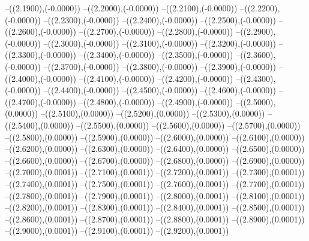 {	--({\sx*(2.1900)},{\sy*(-0.0000)})
	--({\sx*(2.2000)},{\sy*(-0.0000)})
	--({\sx*(2.2100)},{\sy*(-0.0000)})
	--({\sx*(2.2200)},{\sy*(-0.0000)})
	--({\sx*(2.2300)},{\sy*(-0.0000)})
	--({\sx*(2.2400)},{\sy*(-0.0000)})
	--({\sx*(2.2500)},{\sy*(-0.0000)})
	--({\sx*(2.2600)},{\sy*(-0.0000)})
	--({\sx*(2.2700)},{\sy*(-0.0000)})
	--({\sx*(2.2800)},{\sy*(-0.0000)})
	--({\sx*(2.2900)},{\sy*(-0.0000)})
	--({\sx*(2.3000)},{\sy*(-0.0000)})
	--({\sx*(2.3100)},{\sy*(-0.0000)})
	--({\sx*(2.3200)},{\sy*(-0.0000)})
	--({\sx*(2.3300)},{\sy*(-0.0000)})
	--({\sx*(2.3400)},{\sy*(-0.0000)})
	--({\sx*(2.3500)},{\sy*(-0.0000)})
	--({\sx*(2.3600)},{\sy*(-0.0000)})
	--({\sx*(2.3700)},{\sy*(-0.0000)})
	--({\sx*(2.3800)},{\sy*(-0.0000)})
	--({\sx*(2.3900)},{\sy*(-0.0000)})
	--({\sx*(2.4000)},{\sy*(-0.0000)})
	--({\sx*(2.4100)},{\sy*(-0.0000)})
	--({\sx*(2.4200)},{\sy*(-0.0000)})
	--({\sx*(2.4300)},{\sy*(-0.0000)})
	--({\sx*(2.4400)},{\sy*(-0.0000)})
	--({\sx*(2.4500)},{\sy*(-0.0000)})
	--({\sx*(2.4600)},{\sy*(-0.0000)})
	--({\sx*(2.4700)},{\sy*(-0.0000)})
	--({\sx*(2.4800)},{\sy*(-0.0000)})
	--({\sx*(2.4900)},{\sy*(-0.0000)})
	--({\sx*(2.5000)},{\sy*(0.0000)})
	--({\sx*(2.5100)},{\sy*(0.0000)})
	--({\sx*(2.5200)},{\sy*(0.0000)})
	--({\sx*(2.5300)},{\sy*(0.0000)})
	--({\sx*(2.5400)},{\sy*(0.0000)})
	--({\sx*(2.5500)},{\sy*(0.0000)})
	--({\sx*(2.5600)},{\sy*(0.0000)})
	--({\sx*(2.5700)},{\sy*(0.0000)})
	--({\sx*(2.5800)},{\sy*(0.0000)})
	--({\sx*(2.5900)},{\sy*(0.0000)})
	--({\sx*(2.6000)},{\sy*(0.0000)})
	--({\sx*(2.6100)},{\sy*(0.0000)})
	--({\sx*(2.6200)},{\sy*(0.0000)})
	--({\sx*(2.6300)},{\sy*(0.0000)})
	--({\sx*(2.6400)},{\sy*(0.0000)})
	--({\sx*(2.6500)},{\sy*(0.0000)})
	--({\sx*(2.6600)},{\sy*(0.0000)})
	--({\sx*(2.6700)},{\sy*(0.0000)})
	--({\sx*(2.6800)},{\sy*(0.0000)})
	--({\sx*(2.6900)},{\sy*(0.0000)})
	--({\sx*(2.7000)},{\sy*(0.0001)})
	--({\sx*(2.7100)},{\sy*(0.0001)})
	--({\sx*(2.7200)},{\sy*(0.0001)})
	--({\sx*(2.7300)},{\sy*(0.0001)})
	--({\sx*(2.7400)},{\sy*(0.0001)})
	--({\sx*(2.7500)},{\sy*(0.0001)})
	--({\sx*(2.7600)},{\sy*(0.0001)})
	--({\sx*(2.7700)},{\sy*(0.0001)})
	--({\sx*(2.7800)},{\sy*(0.0001)})
	--({\sx*(2.7900)},{\sy*(0.0001)})
	--({\sx*(2.8000)},{\sy*(0.0001)})
	--({\sx*(2.8100)},{\sy*(0.0001)})
	--({\sx*(2.8200)},{\sy*(0.0001)})
	--({\sx*(2.8300)},{\sy*(0.0001)})
	--({\sx*(2.8400)},{\sy*(0.0001)})
	--({\sx*(2.8500)},{\sy*(0.0001)})
	--({\sx*(2.8600)},{\sy*(0.0001)})
	--({\sx*(2.8700)},{\sy*(0.0001)})
	--({\sx*(2.8800)},{\sy*(0.0001)})
	--({\sx*(2.8900)},{\sy*(0.0001)})
	--({\sx*(2.9000)},{\sy*(0.0001)})
	--({\sx*(2.9100)},{\sy*(0.0001)})
	--({\sx*(2.9200)},{\sy*(0.0001)})
}
